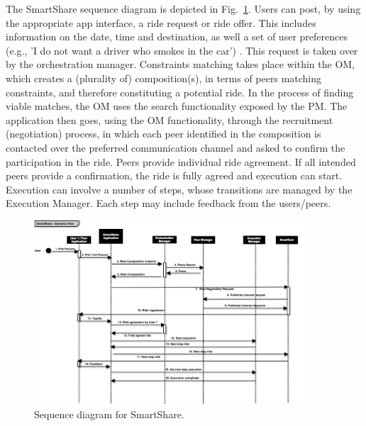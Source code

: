The SmartShare sequence diagram is depicted in Fig.~\ref{fig:smartshare}. Users can post, by using the appropriate app interface, a ride request or ride offer. This includes information on the date, time and destination, as well a set of user preferences (e.g., 'I do not want a driver who smokes in the car') . This request is taken over by the orchestration manager. Constraints matching takes place within the OM, which creates a (plurality of) composition(s), in terms of peers matching constraints, and therefore constituting a potential ride. In the process of finding viable matches, the OM uses the search functionality exposed by the PM. 
The application then goes, using the OM functionality, through the recruitment (negotiation) process, in which each peer identified in the composition is contacted over the preferred communication channel and asked to confirm the participation in the ride. Peers provide individual ride agreement. If all intended peers provide a confirmation, the ride is fully agreed and execution can start. Execution can involve a number of steps, whose transitions are managed by the Execution Manager. Each step may include feedback from the users/peers. 

\begin{figure}
\centering
\includegraphics[width=0.9\textwidth]{./figs/sequenceRide}
\caption{Sequence diagram for SmartShare.}
\label{fig:smartshare}
\end{figure}
